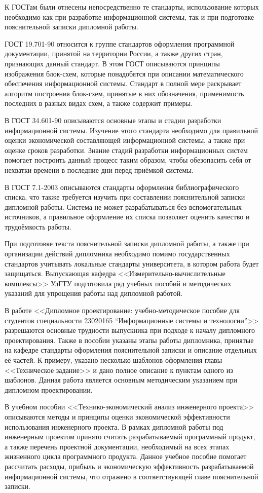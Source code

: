 К ГОСТам были отнесены непосредственно те стандарты, использование которых необходимо как при разработке информационной системы, так и при подготовке пояснительной записки дипломной работы.

ГОСТ 19.701-90 относится к группе стандартов оформления программной документации, принятой на территории России, а также других стран, признающих данный стандарт.
В этом ГОСТ описываются принципы изображения блок-схем, которые понадобятся при описании математического обеспечения информационной системы.
Стандарт в полной мере раскрывает алгоритм построения блок-схем, принятые в них обозначения, применимость последних в разных видах схем, а также содержит примеры.

В ГОСТ 34.601-90 описываются основные этапы и стадии разработки информационной системы.
Изучение этого стандарта необходимо для правильной оценки экономической составляющей информационной системы, а также при оценке сроков разработки.
Знание стадий разработки информационных систем помогает построить данный процесс таким образом, чтобы обезопасить себя от нехватки времени в последние дни перед приёмкой системы.

В ГОСТ 7.1-2003 описываются стандарты оформления библиографического списка, что также требуется изучить при составлении пояснительной записки дипломной работы.
Система не может разрабатываться без вспомогательных источников, а правильное оформление их списка позволяет оценить качество и трудоёмкость работы.

При подготовке текста пояснительной записки дипломной работы, а также при организации действий дипломника необходимо помимо государственных стандартов учитывать локальные стандарты университета, в котором работа будет защищаться.
Выпускающая кафедра <<Измерительно-вычислительные комплексы>> УлГТУ подготовила ряд учебных пособий и методических указаний для упрощения работы над дипломной работой.

В работе <<Дипломное проектирование: учебно-методическое пособие для студентов специальности 23020165 “Информационные системы и технологии”>> разрешаются основные трудности выпускника при подходе к началу дипломного проектирования.
Также в пособии указаны этапы работы дипломника, принятые на кафедре стандарты оформления пояснительной записки и описание отдельных её частей.
К примеру, указано несколько шаблонов оформления главы <<Техническое задание>> и дано полное описание к пунктам одного из шаблонов. 
Данная работа является основным методическим указанием при дипломном проектировании.

В учебном пособии <<Технико-экономический анализ инженерного проекта>> описываются методы и принципы оценки экономической эффективности использования инженерного проекта.
В рамках дипломной работы под инженерным проектом принято считать разрабатываемый программный продукт, а также перечень проектной документации, необходимый на всех этапах жизненного цикла программного продукта.
Данное учебное пособие помогает рассчитать расходы, прибыль и экономическую эффективность разрабатываемой информационной системы, что отражено в соответствующей главе пояснительной записки.

\clearpage
\newpage
